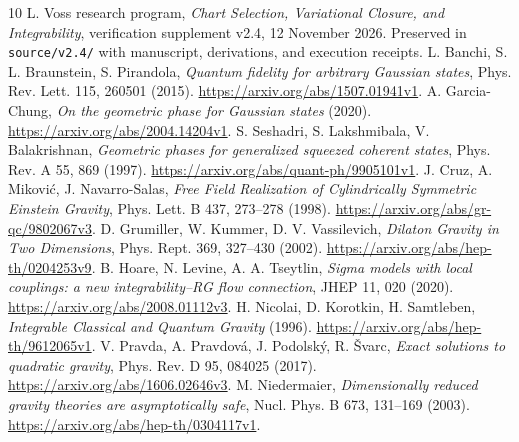 \documentclass[11pt]{article}
\begin{document}
\begin{thebibliography}{10}
 L. Voss research program, \emph{Chart Selection, Variational Closure, and Integrability}, verification supplement v2.4, 12 November 2026. Preserved in \texttt{source/v2.4/} with manuscript, derivations, and execution receipts.
 L. Banchi, S. L. Braunstein, S. Pirandola, \emph{Quantum fidelity for arbitrary Gaussian states}, Phys. Rev. Lett. 115, 260501 (2015). \url{https://arxiv.org/abs/1507.01941v1}.
 A. Garcia-Chung, \emph{On the geometric phase for Gaussian states} (2020). \url{https://arxiv.org/abs/2004.14204v1}.
 S. Seshadri, S. Lakshmibala, V. Balakrishnan, \emph{Geometric phases for generalized squeezed coherent states}, Phys. Rev. A 55, 869 (1997). \url{https://arxiv.org/abs/quant-ph/9905101v1}.
 J. Cruz, A. Mikovi\'c, J. Navarro-Salas, \emph{Free Field Realization of Cylindrically Symmetric Einstein Gravity}, Phys. Lett. B 437, 273--278 (1998). \url{https://arxiv.org/abs/gr-qc/9802067v3}.
 D. Grumiller, W. Kummer, D. V. Vassilevich, \emph{Dilaton Gravity in Two Dimensions}, Phys. Rept. 369, 327--430 (2002). \url{https://arxiv.org/abs/hep-th/0204253v9}.
 B. Hoare, N. Levine, A. A. Tseytlin, \emph{Sigma models with local couplings: a new integrability--RG flow connection}, JHEP 11, 020 (2020). \url{https://arxiv.org/abs/2008.01112v3}.
 H. Nicolai, D. Korotkin, H. Samtleben, \emph{Integrable Classical and Quantum Gravity} (1996). \url{https://arxiv.org/abs/hep-th/9612065v1}.
 V. Pravda, A. Pravdov\'a, J. Podolsk\'y, R. \v Svarc, \emph{Exact solutions to quadratic gravity}, Phys. Rev. D 95, 084025 (2017). \url{https://arxiv.org/abs/1606.02646v3}.
 M. Niedermaier, \emph{Dimensionally reduced gravity theories are asymptotically safe}, Nucl. Phys. B 673, 131--169 (2003). \url{https://arxiv.org/abs/hep-th/0304117v1}.
\end{thebibliography}
\end{document}
